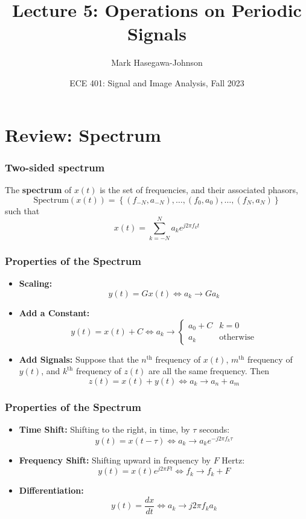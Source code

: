 \documentclass{beamer}
\title{Lecture 5: Operations on Periodic Signals}
\author{Mark Hasegawa-Johnson}
\date{ECE 401: Signal and Image Analysis, Fall 2023}
\begin{document}
\begin{frame}
  \maketitle
\end{frame}

\begin{frame}
  \tableofcontents
\end{frame}

\section[Spectrum]{Review: Spectrum}
\setcounter{subsection}{1}

\begin{frame}
  \frametitle{Two-sided spectrum}

  The {\bf spectrum} of $x(t)$ is the set of frequencies, and their
  associated phasors,
  \[
  \mbox{Spectrum}\left( x(t) \right) =
  \left\{ (f_{-N},a_{-N}), \ldots, (f_0,a_0), \ldots, (f_N,a_N) \right\}
  \]
  such that
  \[
  x(t) = \sum_{k=-N}^N a_ke^{j2\pi f_kt}
  \]
\end{frame}

\begin{frame}
  \frametitle{Properties of the Spectrum}
  \begin{itemize}
  \item {\bf Scaling:}
    \[
    y(t) = Gx(t)\Leftrightarrow a_k \rightarrow Ga_k
    \]
  \item {\bf Add a Constant:}
    \[
    y(t)=x(t)+C \Leftrightarrow
    a_k \rightarrow \begin{cases}
      a_0+C & k=0 \\
      a_k & \mbox{otherwise}
    \end{cases}
    \]
  \item {\bf Add Signals:} Suppose that the $n^{\textrm{th}}$ frequency
    of $x(t)$, $m^{\textrm{th}}$ frequency of $y(t)$, and
    $k^{\textrm{th}}$ frequency of $z(t)$ are all the same frequency.  Then 
    \[
    z(t)=x(t)+y(t)
    \Leftrightarrow
    a_k \rightarrow a_n+a_m
    \]
  \end{itemize}
\end{frame}

\begin{frame}
  \frametitle{Properties of the Spectrum}
  \begin{itemize}
  \item {\bf Time Shift:} Shifting to the right, in time, by $\tau$
    seconds:
    \[
    y(t)=x(t-\tau)\Leftrightarrow a_k\rightarrow a_k e^{-j2\pi f_k\tau}
    \]
  \item {\bf Frequency Shift:} Shifting upward in frequency by $F$
    Hertz:
    \[
    y(t)=x(t)e^{j2\pi Ft} \Leftrightarrow f_k\rightarrow f_k+F
    \]
  \item {\bf Differentiation:}
    \[
    y(t) = \frac{dx}{dt} \Leftrightarrow a_k\rightarrow j2\pi f_k a_k
    \]
  \end{itemize}
\end{frame}  
\end{document}

